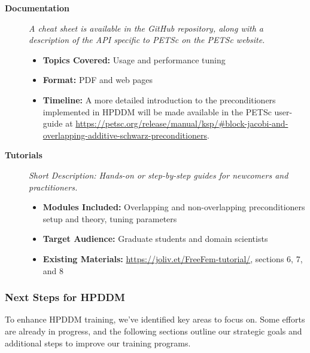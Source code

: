 \begin{description}
\item[\textbf{Documentation}]
\emph{A cheat sheet is available in the GitHub repository, along with a description of the API specific to PETSc on the PETSc website.}

\begin{itemize}
  \item \textbf{Topics Covered:} Usage and performance tuning
  \item \textbf{Format:} PDF and web pages
  \item \textbf{Timeline:} A more detailed introduction to the preconditioners implemented in HPDDM will be made available in the PETSc user-guide at \url{https://petsc.org/release/manual/ksp/#block-jacobi-and-overlapping-additive-schwarz-preconditioners}.
\end{itemize}

\item[\textbf{Tutorials}]
\emph{Short Description: Hands-on or step-by-step guides for newcomers and practitioners.}

\begin{itemize}
  \item \textbf{Modules Included:} Overlapping and non-overlapping preconditioners setup and theory, tuning parameters
  \item \textbf{Target Audience:} Graduate students and domain scientists
  \item \textbf{Existing Materials:} \url{https://joliv.et/FreeFem-tutorial/}, sections 6, 7, and 8
\end{itemize}

\end{description}

\subsubsection{Next Steps for HPDDM}
\label{sec:HPDDM:next-steps}

To enhance HPDDM training, we've identified key areas to focus on. Some efforts are already in progress, and the following sections outline our strategic goals and additional steps to improve our training programs.


